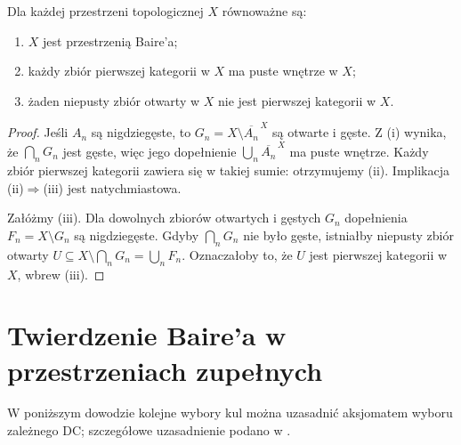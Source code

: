 \begin{stwierdzenie}
\label{prop:topog-baire-rownowaznosci}
Dla każdej przestrzeni topologicznej $X$
równoważne są:
\begin{enumerate}[label=(\roman*)]
\item $X$ jest przestrzenią Baire'a;
\item każdy zbiór pierwszej kategorii w $X$
ma puste wnętrze w $X$;
\item żaden niepusty zbiór otwarty w $X$
nie jest pierwszej kategorii w $X$.
\end{enumerate}
\end{stwierdzenie}
\begin{proof}
Jeśli $A_n$ są nigdziegęste, to
$G_n=X\setminus\overline{A_n}^{\,X}$
są otwarte i gęste. Z (i) wynika, że
$\bigcap_nG_n$ jest gęste, więc jego
dopełnienie $\bigcup_n\overline{A_n}^{\,X}$
ma puste wnętrze. Każdy zbiór pierwszej
kategorii zawiera się w takiej sumie:
otrzymujemy (ii). Implikacja (ii)$\Rightarrow$(iii)
jest natychmiastowa.

Załóżmy (iii). Dla dowolnych zbiorów
otwartych i gęstych $G_n$ dopełnienia
$F_n=X\setminus G_n$ są nigdziegęste.
Gdyby $\bigcap_nG_n$ nie było gęste,
istniałby niepusty zbiór otwarty
$U\subseteq X\setminus\bigcap_nG_n
=\bigcup_nF_n$. Oznaczałoby to, że
$U$ jest pierwszej kategorii w $X$,
wbrew (iii).
\end{proof}

\section{Twierdzenie Baire'a w przestrzeniach zupełnych}
\label{sec:topog-baire-twierdzenie-metryczne}

W poniższym dowodzie kolejne wybory kul można uzasadnić aksjomatem wyboru zależnego DC; szczegółowe uzasadnienie podano w .

